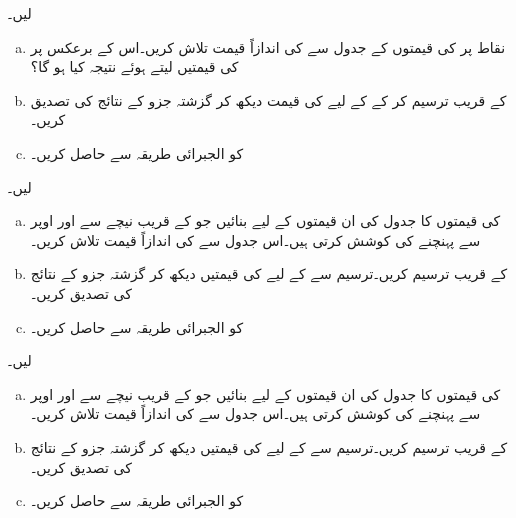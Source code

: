  لیں۔
\begin{enumerate}[a.]
\item
نقاط  پر  کی قیمتوں کے جدول سے  کی اندازاً قیمت تلاش کریں۔اس کے برعکس  پر  کی قیمتیں لیتے ہوئے نتیجہ کیا ہو گا؟
\item
{} کے قریب  ترسیم کر کے  کے لیے  کی قیمت دیکھ کر گزشتہ جزو کے نتائج کی تصدیق کریں۔
\item
{} کو الجبرائی طریقہ سے حاصل کریں۔
\end{enumerate}
 لیں۔
\begin{enumerate}[a.]
\item
{} کی قیمتوں کا جدول  کی ان قیمتوں کے لیے بنائیں جو  کے قریب  نیچے سے اور اوپر سے پہنچنے کی کوشش کرتی ہیں۔اس جدول سے  کی اندازاً قیمت تلاش کریں۔  
\item
{} کے قریب  ترسیم کریں۔ترسیم سے  کے لیے  کی قیمتیں دیکھ کر گزشتہ جزو کے نتائج کی تصدیق کریں۔
\item
{} کو الجبرائی طریقہ سے حاصل کریں۔
\end{enumerate}
 لیں۔
\begin{enumerate}[a.]
\item
{} کی قیمتوں کا جدول  کی ان قیمتوں کے لیے بنائیں جو   کے قریب  نیچے سے اور اوپر سے پہنچنے کی کوشش کرتی ہیں۔اس جدول سے
  کی اندازاً قیمت تلاش کریں۔  
\item
{} کے قریب  ترسیم کریں۔ترسیم سے  کے لیے  کی قیمتیں دیکھ کر گزشتہ جزو کے نتائج کی تصدیق کریں۔
\item
{} کو الجبرائی طریقہ سے حاصل کریں۔
\end{enumerate}
